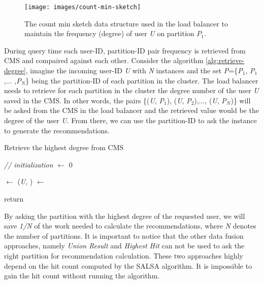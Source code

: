 \begin{figure}[!h]
    \centering
    \texttt{[image: images/count-min-sketch]}
    \caption{The count min sketch data structure used in the load balancer to maintain the frequency (degree) of user \emph{U} on partition \emph{$P_1$}.}
    \label{fig:count-min-sketch}
\end{figure}


During query time each user-ID, partition-ID pair frequency is retrieved from CMS and compaired against each other. Consider the algorithm \ref{alg:retrieve-degree}, imagine the incoming user-ID \emph{U} with \emph{N} instances and the set \emph{P}=\{\emph{P$_1$}, \emph{P$_1$},... ,\emph{P$_N$}\} being the partition-ID of each partition in the cluster. The load balancer needs to retrieve for each partition in the cluster the degree number of the user \emph{U} saved in the CMS. In other words, the pairs \{(\emph{U}, \emph{P$_1$}), (\emph{U}, \emph{P$_2$}),..., (\emph{U}, \emph{P$_N$})\} will be asked from the CMS in the load balancer and the retrieved value would be the degree of the user \emph{U}. From there, we can use the partition-ID to ask the instance to generate the recommendations.


\begin{algorithm}[H]
    \caption{Retrieve the highest degree from CMS}
    \label{alg:retrieve-degree}




    \SetAlgoLined

    \BlankLine\emph{// initialization}\BlankLine
    \degree $\leftarrow$ 0 \;

    \BlankLine
    {
        \tuple $\leftarrow$ (\emph{U}, \partitionId)\;
        \count $\leftarrow$ \;
        \If{ \count $>$ \degree}{
                \degree $\leftarrow$ \count \;
                \partitionToAsk $\leftarrow$ $\partitionId$ \;
            }
    }

    return \partitionToAsk \;

    \BlankLine
\end{algorithm}


By asking the partition with the highest degree of the requested user, we will save \emph{1/N} of the work needed to calculate the recommendations, where \emph{N} denotes the number of partitions. It is important to notice that the other data fusion approaches, namely \emph{Union Result} and \emph{Highest Hit} can not be used to ask the right partition for recommendation calculation. These two approaches highly depend on the hit count computed by the SALSA algorithm. It is impossible to gain the hit count without running the algorithm.

